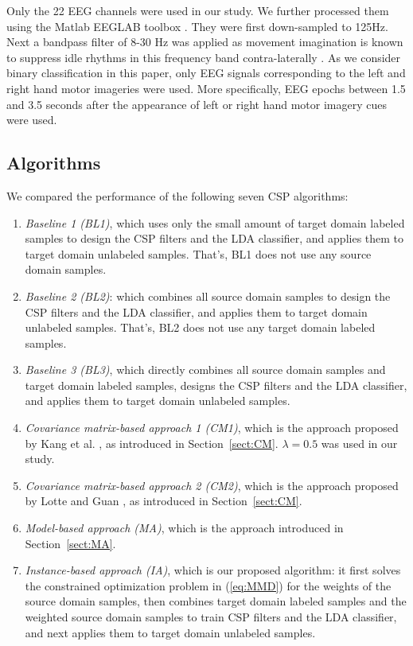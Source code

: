 \documentclass[runningheads]{llncs}
\begin{document}
Only the 22 EEG channels were used in our study. We further processed them using the Matlab EEGLAB toolbox \cite{Delorme2004}. They were first down-sampled to 125Hz. Next a bandpass filter of 8-30 Hz was applied as movement imagination is known to suppress idle rhythms in this frequency band contra-laterally \cite{Pfurtscheller2006}. As we consider binary classification in this paper, only EEG signals corresponding to the left and right hand motor imageries were used. More specifically, EEG epochs between 1.5 and 3.5 seconds after the appearance of left or right hand motor imagery cues were used.

\subsection{Algorithms}

We compared the performance of the following seven CSP algorithms:
\begin{enumerate}
\item \emph{Baseline 1 (BL1)}, which uses only the small amount of target domain labeled samples to design the CSP filters and the LDA classifier, and applies them to target domain unlabeled samples. That's, BL1 does not use any source domain samples.
\item \emph{Baseline 2 (BL2)}: which combines all source domain samples to design the CSP filters and the LDA classifier, and applies them to target domain unlabeled samples. That's, BL2 does not use any target domain labeled samples.
\item \emph{Baseline 3 (BL3)}, which directly combines all source domain samples and target domain labeled samples, designs the CSP filters and the LDA classifier, and applies them to target domain unlabeled samples.
\item \emph{Covariance matrix-based approach 1 (CM1)}, which is the approach proposed by Kang et al. \cite{Kang2009}, as introduced in Section~\ref{sect:CM}. $\lambda=0.5$ was used in our study.
\item \emph{Covariance matrix-based approach 2 (CM2)}, which is the approach proposed by Lotte and Guan \cite{Lotte2010}, as introduced in Section~\ref{sect:CM}.
\item \emph{Model-based approach (MA)}, which is the approach introduced in Section~\ref{sect:MA}.
\item \emph{Instance-based approach (IA)}, which is our proposed algorithm: it first solves the constrained optimization problem in (\ref{eq:MMD}) for the weights of the source domain samples, then combines target domain labeled samples and the weighted source domain samples to train CSP filters and the LDA classifier, and next applies them to target domain unlabeled samples.
\end{enumerate}
\end{document}
